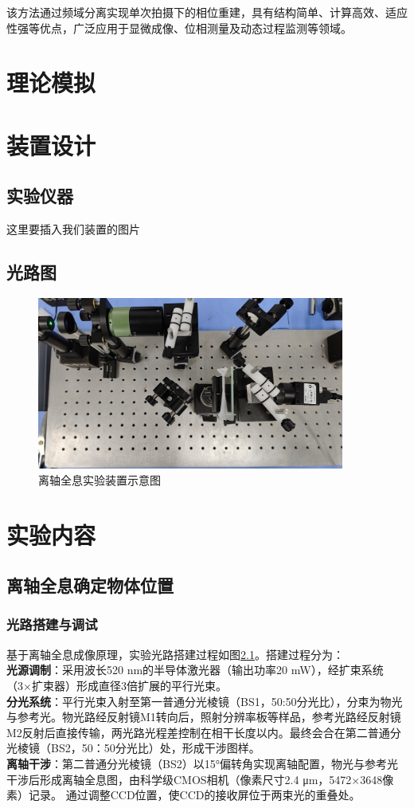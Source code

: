 \documentclass[a4paper,draft]{report}
\begin{document}
该方法通过频域分离实现单次拍摄下的相位重建，具有结构简单、计算高效、适应性强等优点，广泛应用于显微成像、位相测量及动态过程监测等领域。

\chapter{理论模拟}

\chapter{装置设计}
\section{实验仪器}
这里要插入我们装置的图片
\section{光路图}
\begin{figure}[H]
    \centering
    \includegraphics[width=0.9\textwidth]{expreiment}
    \caption{离轴全息实验装置示意图}
    \label{fig:experiment} 
\end{figure}

\chapter{实验内容}
\section{离轴全息确定物体位置}
\subsection{光路搭建与调试}
基于离轴全息成像原理，实验光路搭建过程如图\ref{fig:experiment}。搭建过程分为：\\
\textbf{光源调制}：采用波长520 nm的半导体激光器（输出功率20 mW），经扩束系统（3×扩束器）形成直径3倍扩展的平行光束。\\
\textbf{分光系统}：平行光束入射至第一普通分光棱镜（BS1，50:50分光比），分束为物光与参考光。物光路经反射镜M1转向后，照射分辨率板等样品，参考光路经反射镜M2反射后直接传输，两光路光程差控制在相干长度以内。最终会合在第二普通分光棱镜（BS2，50：50分光比）处，形成干涉图样。\\
\textbf{离轴干涉}：第二普通分光棱镜（BS2）以15°偏转角实现离轴配置，物光与参考光干涉后形成离轴全息图，由科学级CMOS相机（像素尺寸2.4 μm，5472×3648像素）记录。
通过调整CCD位置，使CCD的接收屏位于两束光的重叠处。
\end{document}
